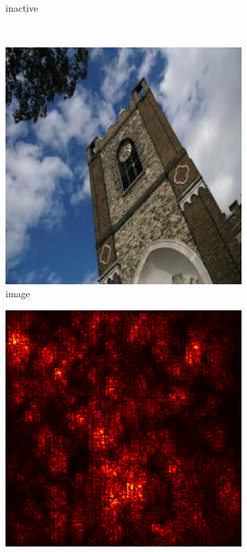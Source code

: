 \documentclass[preprint,12pt]{elsarticle}
\begin{document}
\begin{figure}
\begin{subfigure}{0.14\textwidth}
        \caption{inactive}
    \end{subfigure}\\
    \begin{subfigure}{0.14\linewidth}
        \centering
        \includegraphics[width=\linewidth]{../visualizations/examples/imagenette/cnn/images/6.png}
        \caption{image}
    \end{subfigure}
    \hfill
    \begin{subfigure}{0.14\linewidth}
        \centering
        \includegraphics[width=\linewidth]{../visualizations/examples/imagenette/cnn/saliency_map/6.png}

\end{subfigure}
\end{figure}
\end{document}
